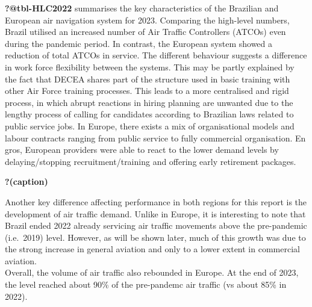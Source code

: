 \documentclass[
  a4paper,
  DIV=11,
  numbers=noendperiod]{scrreport}
\begin{document}
\textbf{?@tbl-HLC2022} summarises the key characteristics of the
Brazilian and European air navigation system for 2023. Comparing the
high-level numbers, Brazil utilised an increased number of Air Traffic
Controllers (ATCOs) even during the pandemic period. In contrast, the
European system showed a reduction of total ATCOs in service. The
different behaviour suggests a difference in work force flexibility
between the systems. This may be partly explained by the fact that DECEA
shares part of the structure used in basic training with other Air Force
training processes. This leads to a more centralised and rigid process,
in which abrupt reactions in hiring planning are unwanted due to the
lengthy process of calling for candidates according to Brazilian laws
related to public service jobs. In Europe, there exists a mix of
organisational models and labour contracts ranging from public service
to fully commercial organisation. En gros, European providers were able
to react to the lower demand levels by delaying/stopping
recruitment/training and offering early retirement packages.

\begin{table}

\caption{\textbf{?(caption)}}\begin{minipage}[t]{\linewidth}

{\centering 


}

\end{minipage}%

\end{table}

Another key difference affecting performance in both regions for this
report is the development of air traffic demand. Unlike in Europe, it is
interesting to note that Brazil ended 2022 already servicing air traffic
movements above the pre-pandemic (i.e.~2019) level. However, as will be
shown later, much of this growth was due to the strong increase in
general aviation and only to a lower extent in commercial aviation.\\
Overall, the volume of air traffic also rebounded in Europe. At the end
of 2023, the level reached about 90\% of the pre-pandemc air traffic (vs
about 85\% in 2022).
\end{document}
